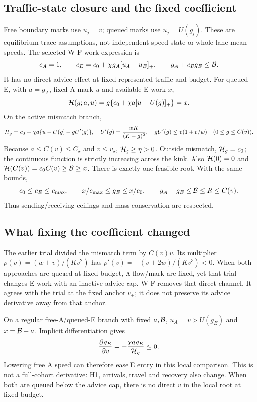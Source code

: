 \subsection{Traffic-state closure and the fixed coefficient}
Free boundary marks use $u_j=v$; queued marks use $u_j=U(g_j)$. These
are equilibrium trace assumptions, not independent speed state or
whole-lane mean speeds. The selected W-F work expression is
\begin{equation}
 c_A=1,\qquad c_E=c_0+\chi g_A[u_A-u_E]_+,\qquad
 g_A+c_Eg_E\leq\mathcal B. \label{eq:currentwork}
\end{equation}
It has no direct advice effect at fixed represented traffic and budget.
For queued E, with $a=g_A$, fixed A mark $u$ and available E work $x$,
\begin{equation}
 \mathcal H(g;a,u)=g\{c_0+\chi a[u-U(g)]_+\}=x.
 \label{eq:root}
\end{equation}
On the active mismatch branch,
\begin{equation}
 \mathcal H_g=c_0+\chi a\{u-U(g)-gU'(g)\},\quad
 U'(g)=\frac{wK}{(K-g)^2},\quad
 gU'(g)\leq v(1+v/w)\quad(0\leq g\leq C(v)).
 \label{eq:rootderiv}
\end{equation}
Because $a\leq C(v)\leq C_\star$ and $v\leq v_\star$,
$\mathcal H_g\geq\eta>0$. Outside mismatch, $\mathcal H_g=c_0$; the continuous
function is strictly increasing across the kink. Also
$\mathcal H(0)=0$ and $\mathcal H(C(v))=c_0C(v)\geq\mathcal B\geq x$.
There is exactly one feasible root. With the same bounds,
\begin{equation}
 c_0\leq c_E\leq c_{\max},\qquad
 x/c_{\max}\leq g_E\leq x/c_0,\qquad
 g_A+g_E\leq\mathcal B\leq R\leq C(v).
 \label{eq:rootbounds}
\end{equation}
Thus sending/receiving ceilings and mass conservation are respected.

\subsection{What fixing the coefficient changed}
The earlier trial divided the mismatch term by $C(v)v$. Its multiplier
$\rho(v)=(w+v)/(Kv^2)$ has
$\rho'(v)=-(v+2w)/(Kv^3)<0$. When both approaches are queued at fixed
budget, A flow/mark are fixed, yet that trial changes E work with an
inactive advice cap. W-F removes that direct channel. It agrees with the
trial at the fixed anchor $v_+$; it does not preserve its advice derivative
away from that anchor.

On a regular free-A/queued-E branch with fixed $a,\mathcal B$,
$u_A=v>U(g_E)$ and $x=\mathcal B-a$. Implicit differentiation gives
\begin{equation}
 \frac{\partial g_E}{\partial v}
 =-\frac{\chi a g_E}{\mathcal H_g}\leq0. \label{eq:localbenefit}
\end{equation}
Lowering free A speed can therefore ease E entry in this local comparison.
This is not a full-cohort derivative: H1, arrivals, travel and recovery
also change. When both are queued below the advice cap, there is no direct
$v$ in the local root at fixed budget.

